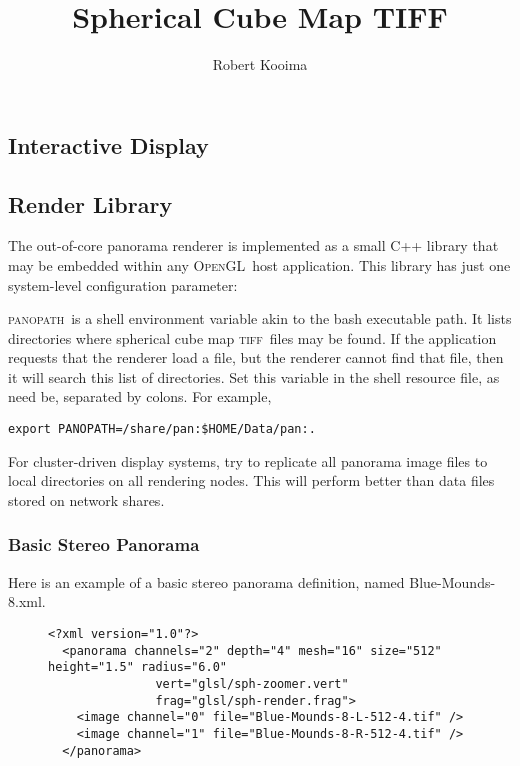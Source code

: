 \documentclass[article,twocolumn,10pt]{memoir}
\newcommand{\opengl}  {\textsc{OpenGL}}
\newcommand{\tiff}    {\textsc{tiff}}
\newcommand{\panopath}{\textsc{panopath}}
\begin{document}
\title{Spherical Cube Map TIFF}
\author{Robert Kooima}
\maketitle
\begin{Spacing}{1.1}




\chapter{Interactive Display}

\section{Render Library}

The out-of-core panorama renderer is implemented as a small C++ library that may be embedded within any \opengl\ host application. This library has just one system-level configuration parameter:

\panopath\ is a shell environment variable akin to the bash executable path. It lists directories where spherical cube map \tiff\ files may be found. If the application requests that the renderer load a file, but the renderer cannot find that file, then it will search this list of directories. Set this variable in the shell resource file, as need be, separated by colons. For example,

\texttt{export PANOPATH=/share/pan:\$HOME/Data/pan:.}

For cluster-driven display systems, try to replicate all panorama image files to local directories on all rendering nodes. This will perform better than data files stored on network shares.

\subsection{Basic Stereo Panorama}

Here is an example of a basic stereo panorama definition, named Blue-Mounds-8.xml.

\begin{figure*}
\begin{verbatim}
<?xml version="1.0"?>
  <panorama channels="2" depth="4" mesh="16" size="512" height="1.5" radius="6.0"
               vert="glsl/sph-zoomer.vert"
               frag="glsl/sph-render.frag">
    <image channel="0" file="Blue-Mounds-8-L-512-4.tif" />
    <image channel="1" file="Blue-Mounds-8-R-512-4.tif" />
  </panorama>
\end{verbatim}
\end{figure*}


\end{Spacing}
\end{document}
